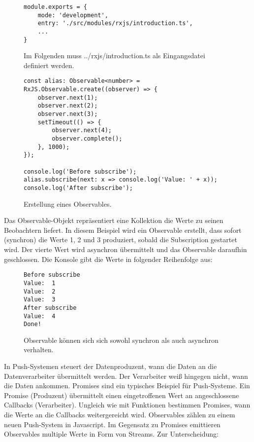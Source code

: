 \begin{figure}[H]
\begin{lstlisting}[basicstyle=\small]
module.exports = {
    mode: 'development',
    entry: './src/modules/rxjs/introduction.ts',
    ...
}
\end{lstlisting}
\caption{Im Folgenden muss ../rxjs/introduction.ts als Eingangsdatei definiert werden.}
\end{figure}

\begin{figure}[H]
\begin{lstlisting}[basicstyle=\small]
const alias: Observable<number> = RxJS.Observable.create((observer) => {
    observer.next(1);
    observer.next(2);
    observer.next(3);
    setTimeout(() => {
        observer.next(4);
        observer.complete();
    }, 1000);
});

console.log('Before subscribe');
alias.subscribe(next: x => console.log('Value: ' + x));
console.log('After subscribe');
\end{lstlisting}
\caption{Erstellung eines Observables.}
\label{creation-of-observable-first-example}
\end{figure}

\noindent
Das Observable-Objekt repräsentiert eine Kollektion die Werte zu seinen Beobachtern liefert. In diesem Beispiel wird ein Observable erstellt, dass sofort (synchron) die Werte 1, 2 und 3 produziert, sobald die Subscription gestartet wird. Der vierte Wert wird asynchron übermittelt und das Observable daraufhin geschlossen. Die Konsole gibt die Werte in folgender Reihenfolge aus:

\begin{figure}[H]
\begin{lstlisting}
Before subscribe
Value:  1
Value:  2
Value:  3
After subscribe
Value:  4
Done!
\end{lstlisting}
\caption{Observable können sich sich sowohl synchron als auch asynchron verhalten.}
\end{figure}

\noindent
In Push-Systemen steuert der Datenproduzent, wann die Daten an die Datenverarbeiter übermittelt werden. Der Verarbeiter weiß hingegen nicht, wann die Daten ankommen. Promises sind ein typisches Beispiel für Push-Systeme. Ein Promise (Produzent) übermittelt einen eingetroffenen Wert an angeschlossene Callbacks (Verarbeiter). Ungleich wie mit Funktionen bestimmen Promises, wann die Werte an die Callbacks weitergereicht wird. Observables zählen zu einem neuen Push-System in Javascript. Im Gegensatz zu Promises emittieren Observables multiple Werte in Form von Streams. Zur Unterscheidung:

